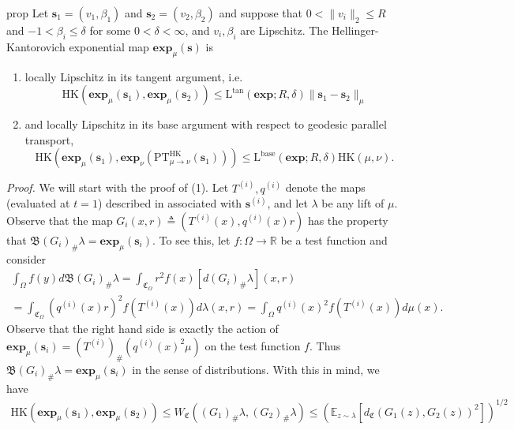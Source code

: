 \documentclass[11pt]{article}
\begin{document}
\begin{restatable}{prop}{}\label{HK exponential map smoothness}
    Let $\mathbf{s}_1 = (v_1, \beta_1)$ and $\mathbf{s}_2 = (v_2, \beta_2)$ and suppose that $0 < \|v_i\|_2 \leq R$ and $-1 < \beta_i \leq \delta$ for some $0 < \delta < \infty$, and $v_i, \beta_i$ are Lipschitz. The Hellinger-Kantorovich exponential map $\mathbf{exp}_{\mu}(\mathbf{s})$ is 
    \begin{enumerate}
        \item locally Lipschitz in its tangent argument, i.e. 
        \[\text{HK}(\mathbf{exp}_{\mu}(\mathbf{s}_1), \mathbf{exp}_{\mu}(\mathbf{s}_2)) \leq \text{L}^{\text{tan}}(\mathbf{exp}; R, \delta)\|\mathbf{s}_1 - \mathbf{s}_2\|_{\mu}\]
        \item and locally Lipschitz in its base argument with respect to geodesic parallel transport,
        \[\text{HK}(\mathbf{exp}_{\mu}(\mathbf{s}_1), \mathbf{exp}_{\nu}(\text{PT}^{\text{HK}}_{\mu \rightarrow \nu}(\mathbf{s}_1))) \leq \text{L}^{\text{base}}(\mathbf{exp}; R, \delta)\text{HK}(\mu, \nu).\]
    \end{enumerate}
\end{restatable}
\noindent \textit{Proof.} We will start with the proof of (1). Let $T^{(i)}, q^{(i)}$ denote the maps (evaluated at $t = 1$) described in  associated with $\mathbf{s}^{(i)}$, and let $\lambda$ be any lift of $\mu$. Observe that the map $G_i(x,r) \triangleq (T^{(i)}(x), q^{(i)}(x)r)$ has the property that $\mathfrak{B}(G_i)_\#\lambda = \mathbf{exp}_{\mu}(\mathbf{s}_i)$. To see this, let $f: \Omega \rightarrow \mathbb{R}$ be a test function and consider
\begin{multline*}
    \int_\Omega f(y)d\mathfrak{B}(G_i)_\#\lambda = \int_{\mathfrak{C}_\Omega}r^2f(x)[d(G_i)_\#\lambda](x,r)\\ = \int_{\mathfrak{C}_\Omega}(q^{(i)}(x)r)^2f(T^{(i)}(x))d\lambda(x,r) = \int_\Omega q^{(i)}(x)^2f(T^{(i)}(x))d\mu(x).
\end{multline*} 
Observe that the right hand side is exactly the action of $\mathbf{exp}_\mu(\mathbf{s}_i) = (T^{(i)})_\#(q^{(i)}(x)^2 \mu)$ on the test function $f$. Thus $\mathfrak{B}(G_i)_\#\lambda = \mathbf{exp}_{\mu}(\mathbf{s}_i)$ in the sense of distributions. With this in mind, we have
\begin{align*}
    \text{HK}(\mathbf{exp}_{\mu}(\mathbf{s}_1), \mathbf{exp}_{\mu}(\mathbf{s}_2)) \leq W_\mathfrak{C}((G_1)_\#\lambda, (G_2)_\#\lambda) \leq \left(\mathbb{E}_{z \sim \lambda}\left[d_\mathfrak{C}(G_1(z), G_2(z))^2\right]\right)^{1/2}
\end{align*}
\end{document}
